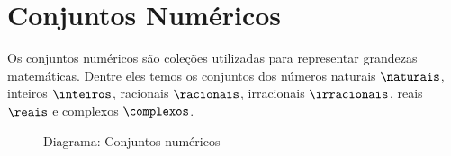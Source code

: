 \section{Conjuntos Numéricos}

Os conjuntos numéricos são coleções utilizadas para representar grandezas matemáticas. Dentre eles temos os conjuntos dos números naturais $\naturais$, inteiros $\inteiros$, racionais $\racionais$, irracionais $\irracionais$, reais $\reais$ e complexos $\complexos$.

\begin{figure}[H]
	\centering
	\caption{Diagrama: Conjuntos numéricos}
\end{figure}

